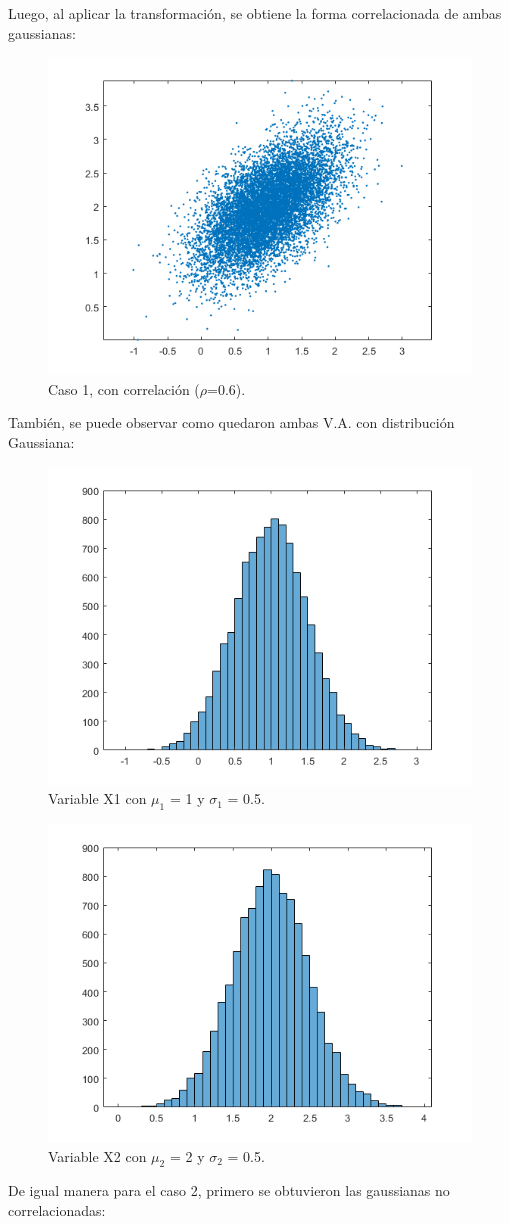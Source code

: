 Luego, al aplicar la transformación, se obtiene la forma correlacionada de ambas gaussianas:

\begin{figure}[H]
	\centering
	\includegraphics[width=0.4\linewidth]{./ImagenesEjercicio2/GaussianaBivariableCorr1.PNG}
	\caption{Caso 1, con correlación ($\rho$=0.6).}
	\label{fig:G1CC}
\end{figure}

También, se puede observar como quedaron ambas V.A. con distribución Gaussiana:

\begin{figure}[H]
	\centering
	\includegraphics[width=0.5\linewidth]{./ImagenesEjercicio2/X1a.PNG}
	\caption{Variable X1 con $\mu_1$ = 1 y $\sigma_1$ = 0.5.}
	\label{fig:X1a}
\end{figure}
\begin{figure}[H]
	\centering
	\includegraphics[width=0.5\linewidth]{./ImagenesEjercicio2/X2a.PNG}
	\caption{Variable X2 con $\mu_2$ = 2 y $\sigma_2$ = 0.5.}
	\label{fig:X2a}
\end{figure}

De igual manera para el caso 2, primero se obtuvieron las gaussianas no correlacionadas:

